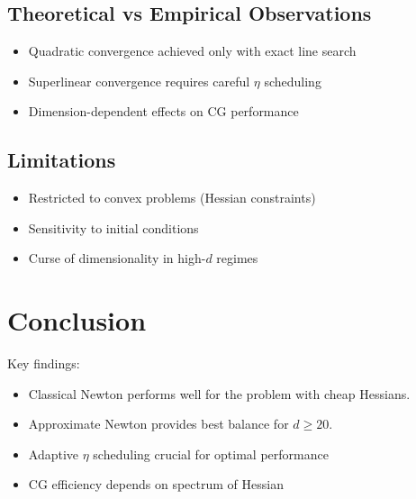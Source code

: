 \documentclass[12pt]{article}
\begin{document}
\subsection{Theoretical vs Empirical Observations}
\begin{itemize}
    \item Quadratic convergence achieved only with exact line search
    \item Superlinear convergence requires careful $\eta$ scheduling
    \item Dimension-dependent effects on CG performance
\end{itemize}

\subsection{Limitations}
\begin{itemize}
    \item Restricted to convex problems (Hessian constraints)
    \item Sensitivity to initial conditions
    \item Curse of dimensionality in high-$d$ regimes
\end{itemize}


\section{Conclusion}

Key findings:
\begin{itemize}
    \item Classical Newton performs well for the problem with cheap Hessians.
    \item Approximate Newton provides best balance for $d \geq 20$. 
    \item Adaptive $\eta$ scheduling crucial for optimal performance
    \item CG efficiency depends on spectrum of Hessian
\end{itemize}
\end{document}
